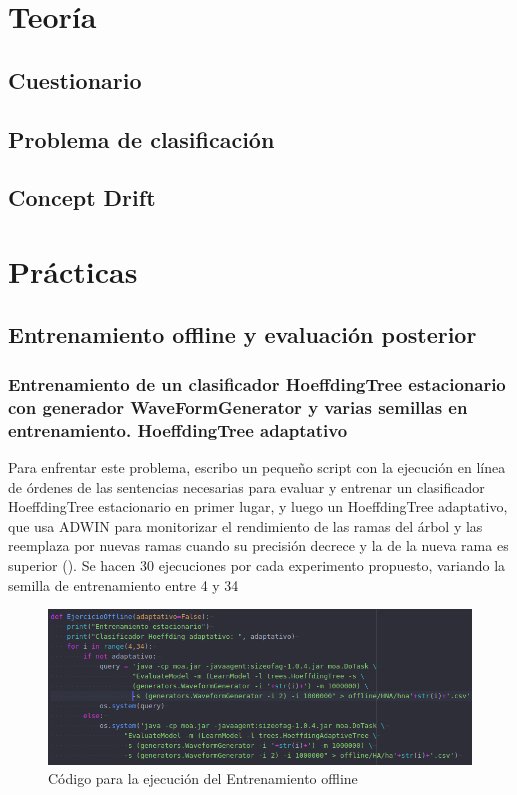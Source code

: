 \section{Teoría}

\subsection{Cuestionario}

\subsection{Problema de clasificación}

\subsection{Concept Drift}

\section{Prácticas}

\subsection{Entrenamiento offline y evaluación posterior}

\subsubsection{Entrenamiento de un clasificador HoeffdingTree estacionario con generador WaveFormGenerator y varias semillas en entrenamiento. HoeffdingTree adaptativo}

Para enfrentar este problema, escribo un pequeño script con la ejecución en línea de órdenes de las sentencias necesarias para evaluar y entrenar un clasificador HoeffdingTree estacionario en primer lugar, y luego un HoeffdingTree adaptativo, que usa ADWIN para monitorizar el rendimiento de las ramas del árbol y las reemplaza por nuevas ramas cuando su precisión decrece y la de la nueva rama es superior (\cite{HA}). Se hacen 30 ejecuciones por cada experimento propuesto, variando la semilla de entrenamiento entre 4 y 34

\begin{figure}[H] %
	\centering
	\includegraphics[scale=0.5]{off-code.png}  %
	\caption{Código para la ejecución del Entrenamiento offline} 
	\label{fig:off1}
\end{figure}

